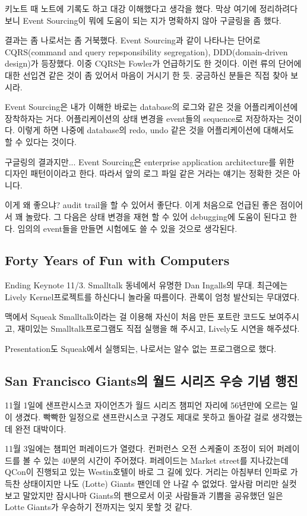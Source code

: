 \documentclass[11pt]{article}
\begin{document}
키노트 때 노트에 기록도 하고 대강 이해했다고 생각을 했다. 막상 여기에
정리하려다 보니 Event Sourcing이 뭐에 도움이 되는 지가 명확하지 않아
구글링을 좀 했다.
 
결과는 좀 나로서는 좀 거북했다. Event Sourcing과 같이 나타나는 단어로
CQRS(command and query repsponsibility segregation), DDD(domain-driven
design)가 등장했다. 이중 CQRS는 Fowler가 언급하기도 한 것이다. 이런
류의 단어에 대한 선입견 같은 것이 좀 있어서 마음이 거시기 한
듯. 궁금하신 분들은 직접 찾아 보시라.
 
Event Sourcing은 내가 이해한 바로는 database의 로그와 같은 것을
어플리케이션에 장착하자는 거다. 어플리케이션의 상태 변경을 event들의
sequence로 저장하자는 것이다. 이렇게 하면 나중에 database의 redo, undo
같은 것을 어플리케이션에 대해서도 할 수 있다는 것이다.
 
구글링의 결과지만... Event Sourcing은 enterprise application
architecture를 위한 디자인 패턴이이라고 한다. 따라서 앞의 로그 파일
같은 거라는 얘기는 정확한 것은 아니다.
 
이게 왜 좋으냐? audit trail을 할 수 있어서 좋단다. 이게 처음으로 언급된
좋은 점이어서 꽤 놀랐다. 그 다음은 상태 변경을 재현 할 수 있어
debugging에 도움이 된다고 한다. 임의의 event들을 만들면 시험에도 쓸 수
있을 것으로 생각된다.

\subsection{Forty Years of Fun with Computers}

Ending Keynote 11/3. Smalltalk 동네에서 유명한 Dan Ingalls의 무대.
최근에는 Lively Kernel프로젝트를 하신다니 놀라울 따름이다.
관록이 엄청 발산되는 무대였다.
 
맥에서 Squeak Smalltalk이라는 걸 이용해 자신이 처음 만든 포트란 코드도
보여주시고, 재미있는 Smalltalk프로그램도 직접 실행을 해 주시고,
Lively도 시연을 해주셨다.
 
Presentation도 Squeak에서 실행되는, 나로서는 알수 없는 프로그램으로 했다.

\subsection{San Francisco Giants의 월드 시리즈 우승 기념 행진}

11월 1일에 샌프란시스코 자이언츠가 월드 시리즈 챔피언 자리에
56년만에 오르는 일이 생겼다. 빡빡한 일정으로 샌프란시스코 구경도 제대로
못하고 돌아갈 걸로 생각했는데 완전 대박이다. 

11월 3일에는 챔피언 퍼레이드가 열렸다. 컨퍼런스 오전  스케줄이 조정이 
되어 퍼레이드를 볼 수 있는 40분의 시간이 주어졌다.  
퍼레이드는 Market street를 지나갔는데 QCon이 진행되고 있는
Westin호텔이 바로 그 길에 있다. 
거리는 아침부터 인파로 가득찬 상태이지만 나도 (Lotte) Giants 팬인데 안
나갈 수 없었다.
앞사람 머리만 실컷 보고 말았지만 잠시나마 Giants의 팬으로서 이곳
사람들과 기쁨을 공유했던 일은 Lotte Giants가 우승하기 전까지는 잊지
못할 것 같다.

% 

\pagebreak



\end{document}

